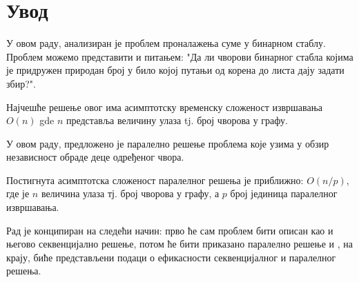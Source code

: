 \section{Увод}
У овом раду, анализиран је проблем проналажења суме у бинарном стаблу. Проблем можемо представити и питањем: "Да ли чворови бинарног стабла којима је придружен
природан број у било којој путањи од корена до листа дају задати збир?".

Најчешће решење овог има асимптотску временску сложеност извршавања $O(n)$ gde $n$ представља величину улаза tj. број чворова у графу.

У овом раду, предложено је паралелно решење проблема које узима у обзир независност обраде деце одређеног чвора.

Постигнута асимптотска сложеност паралелног решења је приближно: $O(n/p)$, где је $n$ величина улаза тј. број чворова у графу, а $p$ број јединица паралелног извршавања.

Рад је конципиран на следећи начин: прво ће сам проблем бити описан као и његово секвенцијално решење, потом ће бити приказано паралелно решење и
, на крају, биће представљени подаци о ефикасности секвенцијалног и паралелног решења.
\pagebreak
